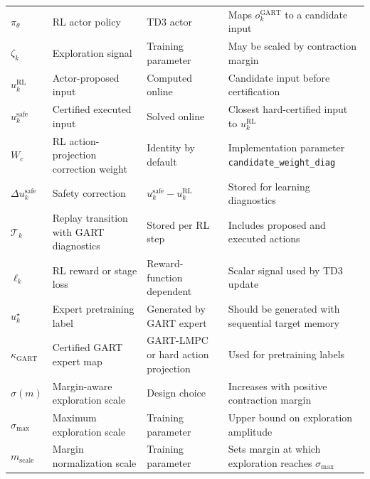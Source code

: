 \documentclass[11pt]{article}
\begin{document}
\begin{longtable}{>{\raggedright\arraybackslash}p{}>{\raggedright\arraybackslash}p{}>{\raggedright\arraybackslash}p{}>{\raggedright\arraybackslash}p{}}
$\pi_\theta$ & RL actor policy & TD3 actor & Maps $o_k^{\mathrm{GART}}$ to a candidate input \\
$\zeta_k$ & Exploration signal & Training parameter & May be scaled by contraction margin \\
$u_k^{\mathrm{RL}}$ & Actor-proposed input & Computed online & Candidate input before certification \\
$u_k^{\mathrm{safe}}$ & Certified executed input & Solved online & Closest hard-certified input to $u_k^{\mathrm{RL}}$ \\
$W_c$ & RL action-projection correction weight & Identity by default & Implementation parameter \texttt{candidate\_weight\_diag} \\
$\Delta u_k^{\mathrm{safe}}$ & Safety correction & $u_k^{\mathrm{safe}}-u_k^{\mathrm{RL}}$ & Stored for learning diagnostics \\
$\mathcal T_k$ & Replay transition with GART diagnostics & Stored per RL step & Includes proposed and executed actions \\
$\ell_k$ & RL reward or stage loss & Reward-function dependent & Scalar signal used by TD3 update \\
$u_k^\star$ & Expert pretraining label & Generated by GART expert & Should be generated with sequential target memory \\
$\kappa_{\mathrm{GART}}$ & Certified GART expert map & GART-LMPC or hard action projection & Used for pretraining labels \\
$\sigma(m)$ & Margin-aware exploration scale & Design choice & Increases with positive contraction margin \\
$\sigma_{\max}$ & Maximum exploration scale & Training parameter & Upper bound on exploration amplitude \\
$m_{\mathrm{scale}}$ & Margin normalization scale & Training parameter & Sets margin at which exploration reaches $\sigma_{\max}$ \\
\bottomrule
\end{longtable}
\endgroup
\end{document}
